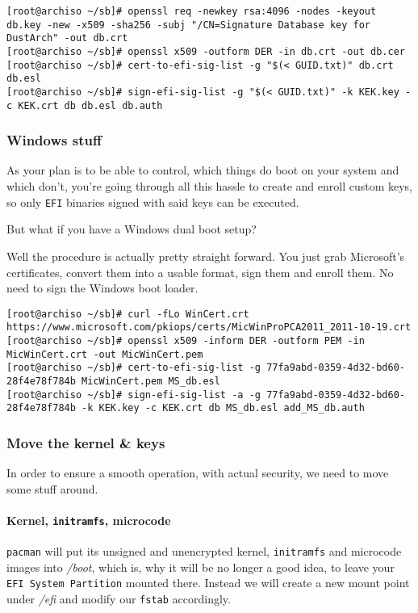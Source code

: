 \documentclass[9pt]{report}
\begin{document}
\begin{verbatim}
[root@archiso ~/sb]# openssl req -newkey rsa:4096 -nodes -keyout db.key -new -x509 -sha256 -subj "/CN=Signature Database key for DustArch" -out db.crt
[root@archiso ~/sb]# openssl x509 -outform DER -in db.crt -out db.cer
[root@archiso ~/sb]# cert-to-efi-sig-list -g "$(< GUID.txt)" db.crt db.esl
[root@archiso ~/sb]# sign-efi-sig-list -g "$(< GUID.txt)" -k KEK.key -c KEK.crt db db.esl db.auth
\end{verbatim}


\newpage

\hypertarget{x-windows-stuff}{\subsubsection{Windows stuff}}
As your plan is to be able to control, which things do boot on your system and which don’t, you’re going through all this hassle to create and enroll custom keys, so only \texttt{EFI} binaries signed with said keys can be executed.


But what if you have a Windows dual boot setup?


Well the procedure is actually pretty straight forward.
You just grab Microsoft’s certificates, convert them into a usable format, sign them and enroll them.
No need to sign the Windows boot loader.


\begin{verbatim}
[root@archiso ~/sb]# curl -fLo WinCert.crt https://www.microsoft.com/pkiops/certs/MicWinProPCA2011_2011-10-19.crt
[root@archiso ~/sb]# openssl x509 -inform DER -outform PEM -in MicWinCert.crt -out MicWinCert.pem
[root@archiso ~/sb]# cert-to-efi-sig-list -g 77fa9abd-0359-4d32-bd60-28f4e78f784b MicWinCert.pem MS_db.esl
[root@archiso ~/sb]# sign-efi-sig-list -a -g 77fa9abd-0359-4d32-bd60-28f4e78f784b -k KEK.key -c KEK.crt db MS_db.esl add_MS_db.auth
\end{verbatim}


\newpage

\hypertarget{x-move-the-kernel-and-keys}{\subsubsection{Move the kernel \& keys}}
In order to ensure a smooth operation, with actual security, we need to move some stuff around.



\newpage

\hypertarget{x-kernel-initramfs-microcode}{\paragraph{Kernel, \texttt{initramfs}, microcode}}
\texttt{pacman} will put its unsigned and unencrypted kernel, \texttt{initramfs} and microcode images into \textit{/boot}, which is, why it will be no longer a good idea, to leave your \texttt{EFI System Partition} mounted there.
Instead we will create a new mount point under \textit{/efi} and modify our \texttt{fstab} accordingly.
\end{document}

